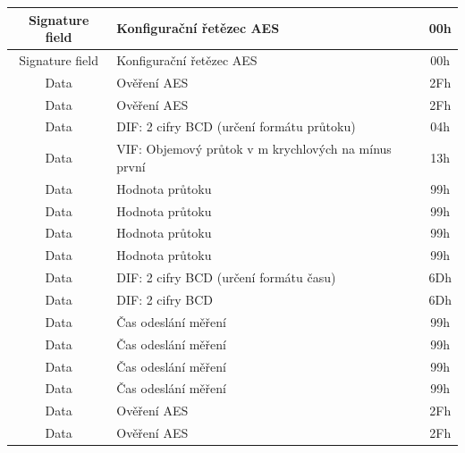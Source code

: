 \begin{table}[!ht]
{\begin{tabular}{|c|l|c|}
Signature field 	 & Konfigurační řetězec AES                       & 00h              \\ \hline
Signature field    & Konfigurační řetězec AES                       & 00h              \\ \hline
Data						   & Ověření AES                                    & 2Fh              \\ \hline
Data						   & Ověření AES                                    & 2Fh              \\ \hline
Data               & DIF: 2 cifry BCD (určení formátu průtoku)      & 04h              \\ \hline
Data               & VIF: Objemový průtok v m krychlových na mínus první & 13h         \\ \hline
Data               & Hodnota průtoku                               & 99h               \\ \hline
Data               & Hodnota průtoku                               & 99h               \\ \hline
Data               & Hodnota průtoku                               & 99h               \\ \hline
Data               & Hodnota průtoku                               & 99h               \\ \hline
Data               & DIF: 2 cifry BCD (určení formátu času)         & 6Dh              \\ \hline
Data               & DIF: 2 cifry BCD                               & 6Dh              \\ \hline
Data               & Čas odeslání měření                           & 99h               \\ \hline
Data               & Čas odeslání měření                           & 99h               \\ \hline
Data               & Čas odeslání měření                           & 99h               \\ \hline
Data               & Čas odeslání měření                           & 99h               \\ \hline	
Data						   & Ověření AES                                    & 2Fh              \\ \hline
Data						   & Ověření AES                                    & 2Fh              \\ \hline \hline

\end{tabular}}
\end{table}


